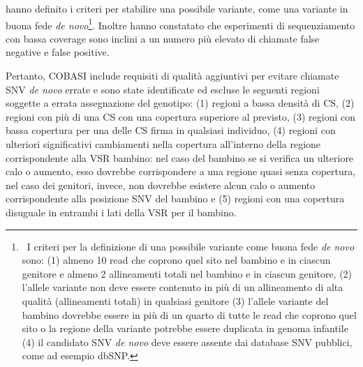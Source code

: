 \documentclass[../main.tex]{subfiles}
\begin{document}
\noindent
\cite{gomez-romero2018cobasi} hanno definito i criteri per stabilire una possibile variante, come una variante in buona fede \textit{de novo}\footnote{\ I criteri per la definizione di una possibile variante come buona fede \textit{de novo} sono: (1) almeno 10 read che coprono quel sito nel bambino e in ciascun genitore e almeno 2 allineamenti totali nel bambino e in ciascun genitore, (2) l'allele variante non deve essere contenuto in più di un allineamento di alta qualità (allineamenti totali) in qualsiasi genitore (3) l'allele variante del bambino dovrebbe essere in più di un quarto di tutte le read che coprono quel sito o la regione della variante potrebbe essere duplicata in genoma infantile (4) il candidato SNV \textit{de novo} deve essere assente dai database SNV pubblici, come ad esempio dbSNP.}. Inoltre hanno constatato che esperimenti di sequenziamento con bassa coverage sono inclini a un numero più elevato di chiamate false negative e false positive. 

Pertanto, COBASI include requisiti di qualità aggiuntivi per evitare chiamate SNV \textit{de novo} errate e sono state identificate ed escluse le seguenti regioni soggette a errata assegnazione del genotipo: (1) regioni a bassa densità di CS, (2) regioni con più di una CS con una copertura superiore al previsto, (3) regioni con bassa copertura per una delle CS firma in qualsiasi individuo, (4) regioni con ulteriori significativi cambiamenti nella copertura all'interno della regione corrispondente alla VSR bambino: nel caso del bambino se si verifica un ulteriore calo o aumento, esso dovrebbe corrispondere a una regione quasi senza copertura, nel caso dei genitori, invece, non dovrebbe esistere alcun calo o aumento corrispondente alla posizione SNV del bambino e (5) regioni con una copertura disuguale in entrambi i lati della VSR per il bambino.
\end{document}
